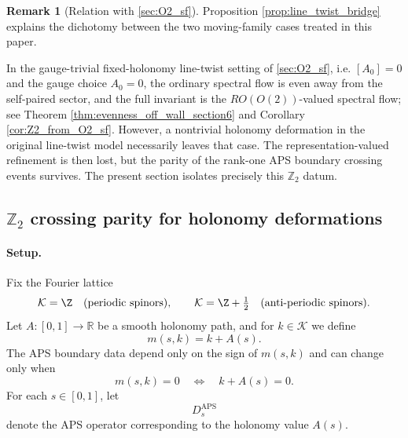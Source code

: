 \documentclass[11pt]{article}
\newcommand{\R}{\mathbb{R}}
\theoremstyle{definition}
\newtheorem{remark}[remark]{Remark}
\DeclareMathOperator{\APS}{APS}
\numberwithin{equation}{section}
\begin{document}
\begin{remark}[Relation with \autoref{sec:O2_sf}]
\label{rem:bridge_evenness_to_Z2}
Proposition \ref{prop:line_twist_bridge} explains the dichotomy between the two moving-family cases treated in this paper.

In the gauge-trivial fixed-holonomy line-twist setting of \autoref{sec:O2_sf}, i.e. \([A_0]=0\) and the gauge choice \(A_0=0\), the ordinary spectral flow is even away from the self-paired sector, and the full invariant is the \(RO(O(2))\)-valued spectral flow; see Theorem \ref{thm:evenness_off_wall_section6} and Corollary \ref{cor:Z2_from_O2_sf}. However, a nontrivial holonomy deformation in the original line-twist model necessarily leaves that case. The representation-valued refinement is then lost, but the parity of the rank-one APS boundary crossing events survives. The present section isolates precisely this \(\mathbb Z_2\) datum.
\end{remark}


\subsection{\texorpdfstring{$\mathbb Z_2$}{Z2} crossing parity for holonomy deformations}
\label{subsec:Z2_flow_holonomy1}

\paragraph{Setup.}
Fix the Fourier lattice
\begin{equation}\label{eq:lattice_section8}
\mathcal K=\Z
\quad\text{(periodic spinors)},
\qquad
\mathcal K=\Z+\tfrac12
\quad\text{(anti-periodic spinors)}.
\end{equation}
Let $A:[0,1]\to\R $ be a smooth holonomy path, and for \(k\in\mathcal K\) we define
\begin{equation}\label{eq:m_sk_section8}
m(s,k)=k+A(s).
\end{equation}
The APS boundary data depend only on the sign of \(m(s,k)\) and can change only when
\begin{equation}
m(s,k)=0
\quad\Longleftrightarrow\quad
k+A(s)=0.
\end{equation}
For each \(s\in[0,1]\), let
\begin{equation}\label{eq:Ds_APS_section8}
D_s^{\APS}
\end{equation}
denote the APS operator corresponding to the holonomy value \(A(s)\).
\end{document}
